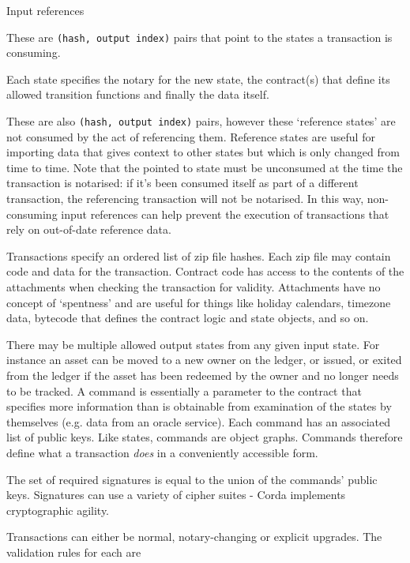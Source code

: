 \documentclass{article}
\begin{document}
\begin{labeling}{Input references}
\item [Consuming input references.] These are \texttt{(hash, output index)} pairs that point to the states a
transaction is consuming.
\item [Output states.] Each state specifies the notary for the new state, the contract(s) that define its allowed
transition functions and finally the data itself.
\item [Non-consuming input references.] These are also \texttt{(hash, output index)} pairs, however these `reference
states' are not consumed by the act of referencing them. Reference states are useful for importing data that gives
context to other states but which is only changed from time to time. Note that the pointed to state must be unconsumed
at the time the transaction is notarised: if it's been consumed itself as part of a different transaction, the referencing
transaction will not be notarised. In this way, non-consuming input references can help prevent the execution of
transactions that rely on out-of-date reference data.
\item [Attachments.] Transactions specify an ordered list of zip file hashes. Each zip file may contain
code and data for the transaction. Contract code has access to the contents of the attachments when checking the
transaction for validity. Attachments have no concept of `spentness' and are useful for things like holiday
calendars, timezone data, bytecode that defines the contract logic and state objects, and so on.
\item [Commands.] There may be multiple allowed output states from any given input state. For instance
an asset can be moved to a new owner on the ledger, or issued, or exited from the ledger if the asset has been
redeemed by the owner and no longer needs to be tracked. A command is essentially a parameter to the contract
that specifies more information than is obtainable from examination of the states by themselves (e.g. data from an oracle
service). Each command has an associated list of public keys. Like states, commands are object graphs. Commands therefore
define what a transaction \emph{does} in a conveniently accessible form.
\item [Signatures.] The set of required signatures is equal to the union of the commands' public keys. Signatures can use
a variety of cipher suites - Corda implements cryptographic agility.
\item [Type.] Transactions can either be normal, notary-changing or explicit upgrades. The validation rules for each are

\end{labeling}
\end{document}
